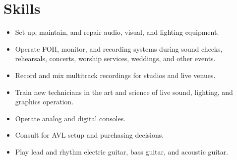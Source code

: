 \documentclass[12pt,sans,colorlinks,linkcolor=blue]{moderncv}        %
\begin{document}
\hypersetup{urlcolor=links}
\makecvtitle
\section{Skills}

\begin{itemize}
\item Set up, maintain, and repair audio, visual, and lighting equipment.
\item Operate FOH, monitor, and recording systems during sound checks, rehearsals, concerts, worship services, weddings, and other events.
\item Record and mix multitrack recordings for studios and live venues.
\item Train new technicians in the art and science of live sound, lighting, and graphics operation.
\item Operate analog and digital consoles.
\item Consult for AVL setup and purchasing decisions.
\item Play lead and rhythm electric guitar, bass guitar, and acoustic guitar.
\end{itemize}
\end{document}
